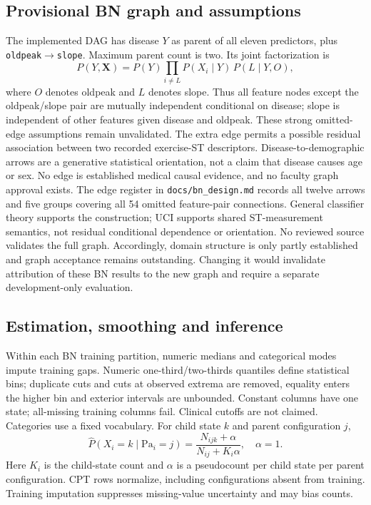 \documentclass[conference]{IEEEtran}
\begin{document}
\subsection{Provisional BN graph and assumptions}
The implemented DAG has disease $Y$ as parent of all eleven predictors, plus \texttt{oldpeak}$\rightarrow$\texttt{slope}. Maximum parent count is two. Its joint factorization is
\begin{equation}
 P(Y,\mathbf X)=P(Y)\!\prod_{i\ne L}P(X_i\mid Y)\,P(L\mid Y,O),
\end{equation}
where $O$ denotes oldpeak and $L$ denotes slope. Thus all feature nodes except the oldpeak/slope pair are mutually independent conditional on disease; slope is independent of other features given disease and oldpeak. These strong omitted-edge assumptions remain unvalidated. The extra edge permits a possible residual association between two recorded exercise-ST descriptors. Disease-to-demographic arrows are a generative statistical orientation, not a claim that disease causes age or sex. No edge is established medical causal evidence, and no faculty graph approval exists. The edge register in \texttt{docs/bn\_design.md} records all twelve arrows and five groups covering all 54 omitted feature-pair connections. General classifier theory supports the construction; UCI supports shared ST-measurement semantics, not residual conditional dependence or orientation. No reviewed source validates the full graph. Accordingly, domain structure is only partly established and graph acceptance remains outstanding. Changing it would invalidate attribution of these BN results to the new graph and require a separate development-only evaluation.

\subsection{Estimation, smoothing and inference}
Within each BN training partition, numeric medians and categorical modes impute training gaps. Numeric one-third/two-thirds quantiles define statistical bins; duplicate cuts and cuts at observed extrema are removed, equality enters the higher bin and exterior intervals are unbounded. Constant columns have one state; all-missing training columns fail. Clinical cutoffs are not claimed. Categories use a fixed vocabulary. For child state $k$ and parent configuration $j$,
\begin{equation}
 \widehat P(X_i=k\mid\mathrm{Pa}_i=j)=\frac{N_{ijk}+\alpha}{N_{ij}+K_i\alpha},\quad\alpha=1.
\end{equation}
Here $K_i$ is the child-state count and $\alpha$ is a pseudocount per child state per parent configuration. CPT rows normalize, including configurations absent from training. Training imputation suppresses missing-value uncertainty and may bias counts.
\end{document}

